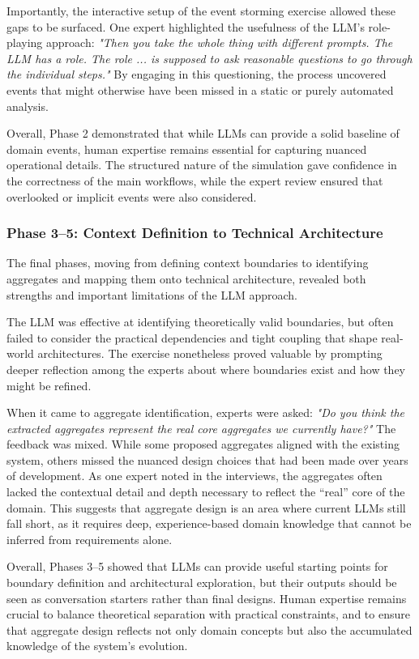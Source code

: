 Importantly, the interactive setup of the event storming exercise allowed these gaps to be surfaced. One expert highlighted the usefulness of the LLM's role-playing approach: \textit{"Then you take the whole thing with different prompts. The LLM has a role. The role ... is supposed to ask reasonable questions to go through the individual steps."} By engaging in this questioning, the process uncovered events that might otherwise have been missed in a static or purely automated analysis.  

Overall, Phase 2 demonstrated that while LLMs can provide a solid baseline of domain events, human expertise remains essential for capturing nuanced operational details. The structured nature of the simulation gave confidence in the correctness of the main workflows, while the expert review ensured that overlooked or implicit events were also considered. 

\subsubsection{Phase 3--5: Context Definition to Technical Architecture}
The final phases, moving from defining context boundaries to identifying aggregates and mapping them onto technical architecture, revealed both strengths and important limitations of the LLM approach.  

The LLM was effective at identifying theoretically valid boundaries, but often failed to consider the practical dependencies and tight coupling that shape real-world architectures. The exercise nonetheless proved valuable by prompting deeper reflection among the experts about where boundaries exist and how they might be refined.  

When it came to aggregate identification, experts were asked: \textit{"Do you think the extracted aggregates represent the real core aggregates we currently have?"} The feedback was mixed. While some proposed aggregates aligned with the existing system, others missed the nuanced design choices that had been made over years of development. As one expert noted in the interviews, the aggregates often lacked the contextual detail and depth necessary to reflect the “real” core of the domain. This suggests that aggregate design is an area where current LLMs still fall short, as it requires deep, experience-based domain knowledge that cannot be inferred from requirements alone.  

Overall, Phases 3--5 showed that LLMs can provide useful starting points for boundary definition and architectural exploration, but their outputs should be seen as conversation starters rather than final designs. Human expertise remains crucial to balance theoretical separation with practical constraints, and to ensure that aggregate design reflects not only domain concepts but also the accumulated knowledge of the system's evolution.

